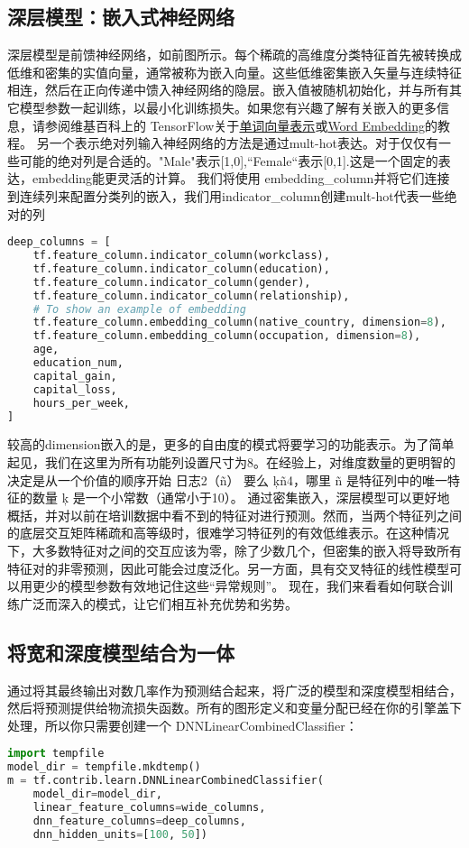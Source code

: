 \subsection{深层模型：嵌入式神经网络}
深层模型是前馈神经网络，如前图所示。每个稀疏的高维度分类特征首先被转换成低维和密集的实值向量，通常被称为嵌入向量。这些低维密集嵌入矢量与连续特征相连，然后在正向传递中馈入神经网络的隐层。嵌入值被随机初始化，并与所有其它模型参数一起训练，以最小化训练损失。如果您有兴趣了解有关嵌入的更多信息，请参阅维基百科上的 TensorFlow关于\href{https://www.tensorflow.org/versions/r0.9/tutorials/word2vec/index.html}{单词向量表示}或\href{https://en.wikipedia.org/wiki/Word_embedding}{Word Embedding}的教程。
另一个表示绝对列输入神经网络的方法是通过mult-hot表达。对于仅仅有一些可能的绝对列是合适的。"Male"表示[1,0],``Female``表示[0,1].这是一个固定的表达，embedding能更灵活的计算。
我们将使用 embedding\_column并将它们连接到连续列来配置分类列的嵌入，我们用indicator\_column创建mult-hot代表一些绝对的列
\begin{lstlisting}[language=Python]
deep_columns = [
    tf.feature_column.indicator_column(workclass),
    tf.feature_column.indicator_column(education),
    tf.feature_column.indicator_column(gender),
    tf.feature_column.indicator_column(relationship),
    # To show an example of embedding
    tf.feature_column.embedding_column(native_country, dimension=8),
    tf.feature_column.embedding_column(occupation, dimension=8),
    age,
    education_num,
    capital_gain,
    capital_loss,
    hours_per_week,
]
\end{lstlisting}
较高的dimension嵌入的是，更多的自由度的模式将要学习的功能表示。为了简单起见，我们在这里为所有功能列设置尺寸为8。在经验上，对维度数量的更明智的决定是从一个价值的顺序开始 日志2⁡（ñ） 要么  ķñ4，哪里  ñ 是特征列中的唯一特征的数量  ķ 是一个小常数（通常小于10）。
通过密集嵌入，深层模型可以更好地概括，并对以前在培训数据中看不到的特征对进行预测。然而，当两个特征列之间的底层交互矩阵稀疏和高等级时，很难学习特征列的有效低维表示。在这种情况下，大多数特征对之间的交互应该为零，除了少数几个，但密集的嵌入将导致所有特征对的非零预测，因此可能会过度泛化。另一方面，具有交叉特征的线性模型可以用更少的模型参数有效地记住这些“异常规则”。
现在，我们来看看如何联合训练广泛而深入的模式，让它们相互补充优势和劣势。
 
\subsection{将宽和深度模型结合为一体}
通过将其最终输出对数几率作为预测结合起来，将广泛的模型和深度模型相结合，然后将预测提供给物流损失函数。所有的图形定义和变量分配已经在你的引擎盖下处理，所以你只需要创建一个 DNNLinearCombinedClassifier：
\begin{lstlisting}[language=Python]
import tempfile
model_dir = tempfile.mkdtemp()
m = tf.contrib.learn.DNNLinearCombinedClassifier(
    model_dir=model_dir,
    linear_feature_columns=wide_columns,
    dnn_feature_columns=deep_columns,
    dnn_hidden_units=[100, 50]) 
\end{lstlisting}
